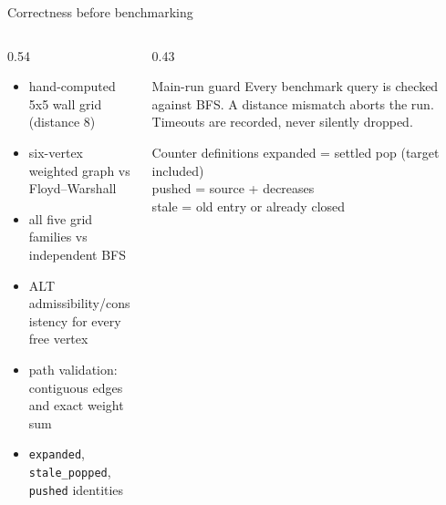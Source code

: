 \documentclass[aspectratio=169,10pt]{beamer}
\begin{document}
\begin{frame}{Correctness before benchmarking}
  \begin{columns}[T,onlytextwidth]
    \begin{column}{0.54\textwidth}
      \begin{itemize}
        \item hand-computed 5x5 wall grid (distance 8)
        \item six-vertex weighted graph vs Floyd--Warshall
        \item all five grid families vs independent BFS
        \item ALT admissibility/consistency for every free vertex
        \item path validation: contiguous edges and exact weight sum
        \item \texttt{expanded}, \texttt{stale\_popped}, \texttt{pushed} identities
      \end{itemize}
    \end{column}
    \begin{column}{0.43\textwidth}
      \begin{block}{Main-run guard}
        Every benchmark query is checked against BFS.  A distance mismatch
        aborts the run.  Timeouts are recorded, never silently dropped.
      \end{block}
      \begin{block}{Counter definitions}
        expanded = settled pop (target included)\\
        pushed = source + decreases\\
        stale = old entry or already closed
      \end{block}
    \end{column}
  \end{columns}
\end{frame}
\end{document}
